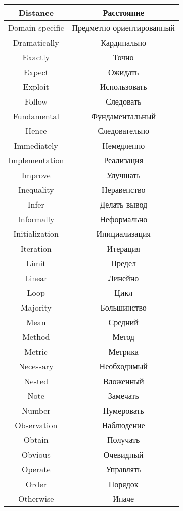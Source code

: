 \begin{table}[h!]
  \centering
  \begin{tabular}{|*{2}{C{.4}|}} \hline
    Distance & Расстояние \\ \hline
    Domain-specific & Предметно-ориентированный \\ \hline
    Dramatically & Кардинально \\ \hline
    Exactly & Точно \\ \hline
    Expect & Ожидать \\ \hline
    Exploit & Использовать \\ \hline
    Follow & Следовать \\ \hline
    Fundamental & Фундаментальный \\ \hline
    Hence & Следовательно \\ \hline
    Immediately & Немедленно \\ \hline
    Implementation & Реализация \\ \hline
    Improve & Улучшать \\ \hline
    Inequality & Неравенство \\ \hline
    Infer & Делать вывод \\ \hline
    Informally & Неформально \\ \hline
    Initialization & Инициализация \\ \hline
    Iteration & Итерация \\ \hline
    Limit & Предел \\ \hline
    Linear & Линейно \\ \hline
    Loop & Цикл \\ \hline
    Majority & Большинство \\ \hline
    Mean & Средний \\ \hline
    Method & Метод \\ \hline
    Metric & Метрика \\ \hline
    Necessary & Необходимый \\ \hline
    Nested & Вложенный \\ \hline
    Note & Замечать \\ \hline
    Number & Нумеровать \\ \hline
    Observation & Наблюдение \\ \hline
    Obtain & Получать \\ \hline
    Obvious & Очевидный \\ \hline
    Operate & Управлять \\ \hline
    Order & Порядок \\ \hline
    Otherwise & Иначе \\ \hline
  \end{tabular}
\end{table}

